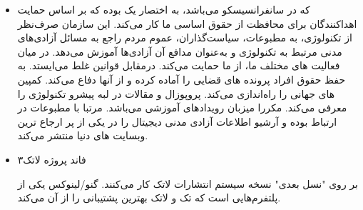 \begin{itemize}
\item
{}

که در سانفرانسیسکو می‌باشد، به اختصار  یک
بوده که بر اساس حمایت اهداکنندگان برای محافظت از حقوق
اساسی ما کار می‌کند. این سازمان صرف‌نظر از تکنولوژی، به
مطبوعات، سیاست‌گذاران، عموم مردم راجع به مسائل آزادی‌های مدنی
مرتبط به تکنولوژی و به‌عنوان مدافع آن آزادی‌ها آموزش می‌دهد.
در میان فعالیت های مختلف ما،  از ما حمایت می‌کند.
درمقابل قوانین غلط می‌ایستد. به حفظ حقوق افراد پرونده های
قضایی را آماده کرده و از آنها دفاع می‌کند. کمپین های جهانی
را راه‌اندازی می‌کند. پروپوزال و مقالات در لبه پیشرو تکنولوژی
را معرفی می‌کند. مکررا میزبان رویدادهای آموزشی می‌باشد.
مرتبا با مطبوعات در ارتباط بوده و آرشیو اطلاعات آزادی مدنی
دیجیتال را در یکی از پر ارجاع ترین وبسایت های دنیا منتشر می‌کند.







\item
فاند پروژه لاتک۳

بر روی "نسل بعدی" نسخه سیستم انتشارات لاتک کار می‌کنند. گنو/لینوکس
یکی از پلتفرم‌هایی است که تک و لاتک بهترین پشتیبانی را از آن می‌کند.





\end{itemize}
